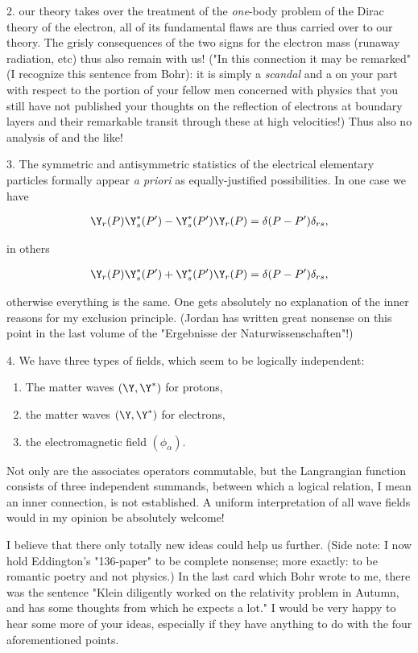 \documentclass{article}
\newcommand{\uequ}[1]{
\begin{align*}
#1
\end{align*}
}
\begin{document}
2.  our theory takes over the treatment of the \textit{one}-body problem of the Dirac theory of the electron, all of its fundamental flaws are thus carried over to our theory. The grisly consequences of the two signs for the electron mass (runaway radiation, etc) thus also remain with us! ("In this connection it may be remarked" (I recognize this sentence from Bohr): it is simply a \textit{scandal} and a  on your part with respect to the portion of your fellow men concerned with physics that you still have not published your thoughts on the reflection of electrons at boundary layers and their remarkable transit through these at high velocities!) Thus also no analysis of  and the like!

3. The symmetric and antisymmetric statistics of the electrical elementary particles formally appear \textit{a priori} as equally-justified possibilities. In one case we have
\uequ{
\Y_r(P)\Y^*_s(P') - \Y_s^*(P')\Y_r(P) = \delta(P-P')\delta_{rs},
}
in others
\uequ{
\Y_r(P)\Y^*_s(P') + \Y_s^*(P')\Y_r(P) = \delta(P-P')\delta_{rs},
}
otherwise everything is the same. One gets absolutely no explanation of the inner reasons for my exclusion principle. (Jordan has written great nonsense on this point in the last volume of the "Ergebnisse der Naturwissenschaften"!)

4. We have three types of fields, which seem to be logically independent:
\begin{enumerate}
    \item The matter waves $(\Y,\Y^*)$ for protons,
    \item the matter waves $(\Y,\Y^*)$ for electrons,
    \item the electromagnetic field $(\phi_\alpha)$.
\end{enumerate}

Not only are the associates operators commutable, but the Langrangian function consists of three independent summands, between which a logical relation, I mean an inner connection, is not established. A uniform interpretation of all wave fields would in my opinion be absolutely welcome!

I believe that there only totally new ideas could help us further. (Side note: I now hold Eddington's "136-paper" to be complete nonsense; more exactly: to be romantic poetry and not physics.) In the last card which Bohr wrote to me, there was the sentence "Klein diligently worked on the relativity problem in Autumn, and has some thoughts from which he expects a lot." I would be very happy to hear some more of your ideas, especially if they have anything to do with the four aforementioned points.
\end{document}

